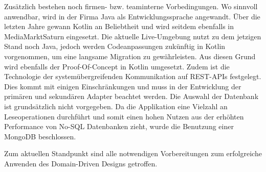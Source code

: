 Zusätzlich bestehen noch firmen- bzw. teaminterne Vorbedingungen. Wo sinnvoll anwendbar, wird in der Firma Java als Entwicklungssprache angewandt. Über die letzten Jahre gewann Kotlin an Beliebtheit und wird seitdem ebenfalls in MediaMarktSaturn eingesetzt. Die aktuelle Live-Umgebung nutzt zu dem jetzigen Stand noch Java, jedoch werden Codeanpassungen zukünftig in Kotlin vorgenommen, um eine langsame Migration zu gewährleisten. Aus diesen Grund wird ebenfalls der Proof-Of-Concept in Kotlin umgesetzt. Zudem ist die Technologie der systemübergreifenden Kommunikation auf REST-APIs festgelegt. Dies kommt mit einigen Einschränkungen und muss in der Entwicklung der primären und sekundären Adapter beachtet werden. Die Auswahl der Datenbank ist grundsätzlich nicht vorgegeben. Da die Applikation eine Vielzahl an Leseoperationen durchführt und somit einen hohen Nutzen aus der erhöhten Performance von No-SQL Datenbanken zieht, wurde die Benutzung einer MongoDB beschlossen.

Zum aktuellen Standpunkt sind alle notwendigen Vorbereitungen zum erfolgreiche Anwenden des Domain-Driven Designs getroffen.  

